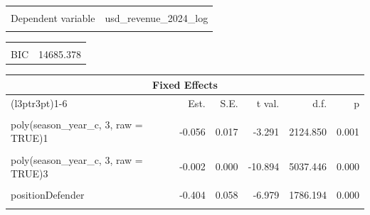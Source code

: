 \documentclass[
  12pt]{article}
\begin{document}
\begin{table}[!h]
\centering
\begin{tabular}{lr}
\toprule
\cellcolor{gray!10}{Observations} & \cellcolor{gray!10}{7023}\\
Dependent variable & usd\_revenue\_2024\_log\\
\cellcolor{gray!10}{Type} & \cellcolor{gray!10}{Mixed effects linear regression}\\
\bottomrule
\end{tabular}
\end{table} \begin{table}[!h]
\centering
\begin{tabular}{lr}
\toprule
\cellcolor{gray!10}{AIC} & \cellcolor{gray!10}{14507.097}\\
BIC & 14685.378\\
\bottomrule
\end{tabular}
\end{table} \begin{table}[!h]
\centering
\begin{threeparttable}
\begin{tabular}{lrrrrr}
\toprule
\multicolumn{6}{c}{Fixed Effects} \\
\cmidrule(l{3pt}r{3pt}){1-6}
  & Est. & S.E. & t val. & d.f. & p\\
\midrule
\cellcolor{gray!10}{(Intercept)} & \cellcolor{gray!10}{16.850} & \cellcolor{gray!10}{0.078} & \cellcolor{gray!10}{215.307} & \cellcolor{gray!10}{82.332} & \cellcolor{gray!10}{0.000}\\
poly(season\_year\_c, 3, raw = TRUE)1 & -0.056 & 0.017 & -3.291 & 2124.850 & 0.001\\
\cellcolor{gray!10}{poly(season\_year\_c, 3, raw = TRUE)2} & \cellcolor{gray!10}{0.028} & \cellcolor{gray!10}{0.003} & \cellcolor{gray!10}{7.947} & \cellcolor{gray!10}{5036.126} & \cellcolor{gray!10}{0.000}\\
poly(season\_year\_c, 3, raw = TRUE)3 & -0.002 & 0.000 & -10.894 & 5037.446 & 0.000\\
\cellcolor{gray!10}{height\_c} & \cellcolor{gray!10}{0.010} & \cellcolor{gray!10}{0.004} & \cellcolor{gray!10}{2.695} & \cellcolor{gray!10}{1799.848} & \cellcolor{gray!10}{0.007}\\
\addlinespace
positionDefender & -0.404 & 0.058 & -6.979 & 1786.194 & 0.000\\
\cellcolor{gray!10}{positionGoalkeeper} & \cellcolor{gray!10}{-1.057} & \cellcolor{gray!10}{0.095} & \cellcolor{gray!10}{-11.159} & \cellcolor{gray!10}{1797.710} & \cellcolor{gray!10}{0.000}\\

\end{tabular}
\end{threeparttable}
\end{table}
\end{document}

